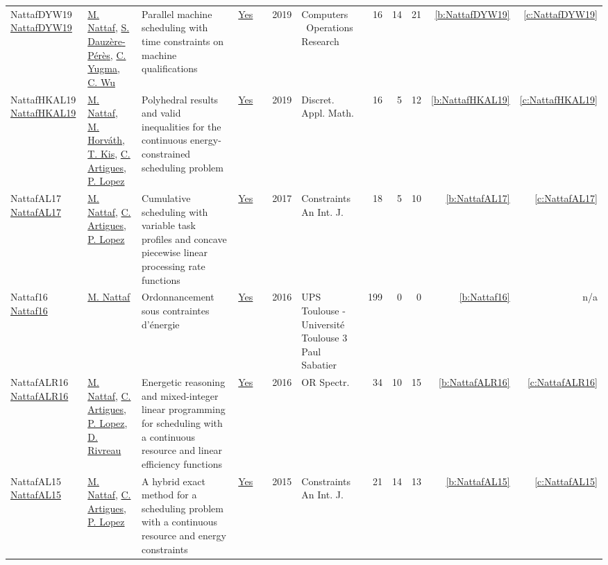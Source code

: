 {\begin{longtable}{>{\raggedright\arraybackslash}p{3cm}>{\raggedright\arraybackslash}p{6cm}>{\raggedright\arraybackslash}p{6.5cm}rrrp{2.5cm}rrrrr}
NattafDYW19 \href{https://doi.org/10.1016/j.cor.2019.03.004}{NattafDYW19} & \hyperref[auth:a81]{M. Nattaf}, \hyperref[auth:a1020]{S. Dauz{\`{e}}re{-}P{\'{e}}r{\`{e}}s}, \hyperref[auth:a1021]{C. Yugma}, \hyperref[auth:a1022]{C. Wu} & Parallel machine scheduling with time constraints on machine qualifications & \href{../works/NattafDYW19.pdf}{Yes} & \cite{NattafDYW19} & 2019 & Computers \  Operations Research & 16 & 14 & 21 & \ref{b:NattafDYW19} & \ref{c:NattafDYW19}\\
NattafHKAL19 \href{https://doi.org/10.1016/j.dam.2018.11.008}{NattafHKAL19} & \hyperref[auth:a81]{M. Nattaf}, \hyperref[auth:a1023]{M. Horv{\'{a}}th}, \hyperref[auth:a157]{T. Kis}, \hyperref[auth:a6]{C. Artigues}, \hyperref[auth:a3]{P. Lopez} & Polyhedral results and valid inequalities for the continuous energy-constrained scheduling problem & \href{../works/NattafHKAL19.pdf}{Yes} & \cite{NattafHKAL19} & 2019 & Discret. Appl. Math. & 16 & 5 & 12 & \ref{b:NattafHKAL19} & \ref{c:NattafHKAL19}\\
NattafAL17 \href{https://doi.org/10.1007/s10601-017-9271-4}{NattafAL17} & \hyperref[auth:a81]{M. Nattaf}, \hyperref[auth:a6]{C. Artigues}, \hyperref[auth:a3]{P. Lopez} & Cumulative scheduling with variable task profiles and concave piecewise linear processing rate functions & \href{../works/NattafAL17.pdf}{Yes} & \cite{NattafAL17} & 2017 & Constraints An Int. J. & 18 & 5 & 10 & \ref{b:NattafAL17} & \ref{c:NattafAL17}\\
Nattaf16 \href{https://laas.hal.science/tel-01417288}{Nattaf16} & \hyperref[auth:a81]{M. Nattaf} & {Ordonnancement sous contraintes d'{\'e}nergie} & \href{../works/Nattaf16.pdf}{Yes} & \cite{Nattaf16} & 2016 & {UPS Toulouse - Universit{\'e} Toulouse 3 Paul Sabatier} & 199 & 0 & 0 & \ref{b:Nattaf16} & n/a\\
NattafALR16 \href{https://doi.org/10.1007/s00291-015-0423-x}{NattafALR16} & \hyperref[auth:a81]{M. Nattaf}, \hyperref[auth:a6]{C. Artigues}, \hyperref[auth:a3]{P. Lopez}, \hyperref[auth:a1003]{D. Rivreau} & Energetic reasoning and mixed-integer linear programming for scheduling with a continuous resource and linear efficiency functions & \href{../works/NattafALR16.pdf}{Yes} & \cite{NattafALR16} & 2016 & {OR} Spectr. & 34 & 10 & 15 & \ref{b:NattafALR16} & \ref{c:NattafALR16}\\
NattafAL15 \href{https://doi.org/10.1007/s10601-015-9192-z}{NattafAL15} & \hyperref[auth:a81]{M. Nattaf}, \hyperref[auth:a6]{C. Artigues}, \hyperref[auth:a3]{P. Lopez} & A hybrid exact method for a scheduling problem with a continuous resource and energy constraints & \href{../works/NattafAL15.pdf}{Yes} & \cite{NattafAL15} & 2015 & Constraints An Int. J. & 21 & 14 & 13 & \ref{b:NattafAL15} & \ref{c:NattafAL15}\\
\end{longtable}
}

